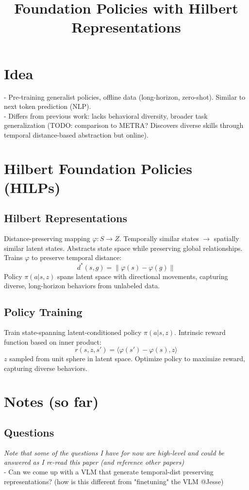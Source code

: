 \documentclass{article}
\title{Foundation Policies with Hilbert Representations}
\begin{document}
\maketitle

\section*{Idea}

- Pre-training generalist policies, offline data (long-horizon, zero-shot). Similar to next token prediction (NLP). \\
- Differs from previous work: lacks behavioral diversity, broader task generalization (TODO: comparison to METRA? Discovers diverse skills through temporal distance-based abstraction but online).

\section{Hilbert Foundation Policies (HILPs)}
\subsection{Hilbert Representations}
Distance-preserving mapping $\varphi: S \to Z$. Temporally similar states $\to$ spatially similar latent states. Abstracts state space while preserving global relationships. Trains $\varphi$ to preserve temporal distance:
\[
d^*(s, g) = \|\varphi(s) - \varphi(g)\|
\]
Policy $\pi(a | s, z)$ spans latent space with directional movements, capturing diverse, long-horizon behaviors from unlabeled data.

\subsection{Policy Training}
Train state-spanning latent-conditioned policy $\pi(a | s, z)$. Intrinsic reward function based on inner product:
\[
r(s, z, s') = \langle \varphi(s') - \varphi(s), z \rangle
\]
$z$ sampled from unit sphere in latent space. Optimize policy to maximize reward, capturing diverse behaviors.


\section{Notes (so far)}
\subsection{Questions}
\textit{Note that some of the questions I have for now are high-level and could be answered as I re-read this paper (and reference other papers)} \\
- Can we come up with a VLM that generate temporal-dist preserving representations? (how is this different from "finetuning" the VLM @Jesse) \\
\end{document}
